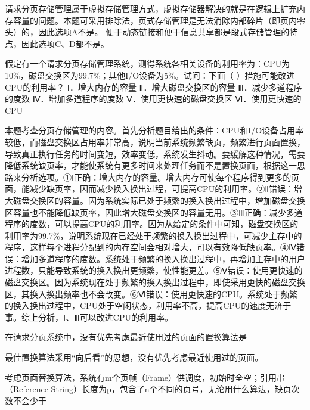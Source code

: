 \begin{solution}请求分页存储管理属于虚拟存储管理方式，虚拟存储器解决的就是在逻辑上扩充内存容量的问题。本题可采用排除法，页式存储管理是无法消除内部碎片（即页内零头）的，因此选项A不是。
便于动态链接和便于信息共享都是段式存储管理的特点，因此选项C、D都不是。
\end{solution}
\question 假定有一个请求分页存储管理系统，测得系统各相关设备的利用率为：CPU为10\%，磁盘交换区为99.7\%；其他I/O设备为5\%。试问：下面（
）措施可能改进CPU的利用率？ Ⅰ．增大内存的容量 Ⅱ．增大磁盘交换区的容量
Ⅲ．减少多道程序的度数 Ⅳ．增加多道程序的度数 Ⅴ．使用更快速的磁盘交换区
Ⅵ．使用更快速的CPU
\par{}
\begin{solution}本题考查分页存储管理的内容。首先分析题目给出的条件：CPU和I/O设备占用率较低，而磁盘交换区占用率非常高，说明当前系统频繁缺页，频繁进行页面置换，导致真正执行任务的时间变短，效率变低，系统发生抖动。要缓解这种情况，需要降低系统缺页率，才能使系统有更多时间来处理任务而不是置换页面，根据这一思路来分析选项。①Ⅰ正确：增大内存的容量。增大内存可使每个程序得到更多的页面，能减少缺页率，因而减少换入换出过程，可提高CPU的利用率。②Ⅱ错误：增大磁盘交换区的容量。因为系统实际已处于频繁的换入换出过程中，增加磁盘交换区容量也不能降低缺页率，因此增大磁盘交换区的容量无用。③Ⅲ正确：减少多道程序的度数，可以提高CPU的利用率。因为从给定的条件中可知，磁盘交换区的利用率为99.7\%，说明系统现在已经处于频繁的换入换出过程中，可减少主存中的程序，这样每个进程分配到的内存空间会相对增大，可以有效降低缺页率。④Ⅳ错误：增加多道程序的度数。系统处于频繁的换入换出过程中，再增加主存中的用户进程数，只能导致系统的换入换出更频繁，使性能更差。⑤Ⅴ错误：使用更快速的磁盘交换区。因为系统现在处于频繁的换入换出过程中，即使采用更快的磁盘交换区，其换入换出频率也不会改变。⑥Ⅵ错误：使用更快速的CPU。系统处于频繁的换入换出过程中，CPU处于空闲状态，利用率不高，提高CPU的速度无济于事。综上分析，Ⅰ、Ⅲ可以改进CPU的利用率。
\end{solution}
\question 在请求分页系统中，没有优先考虑最近使用过的页面的置换算法是
\par{}
\begin{solution}最佳置换算法采用``向后看''的思想，没有优先考虑最近使用过的页面。
\end{solution}
\question 考虑页面替换算法，系统有m个页帧（Frame）供调度，初始时全空；引用串（Reference
String）长度为p，包含了n个不同的页号，无论用什么算法，缺页次数不会少于
\par{}
